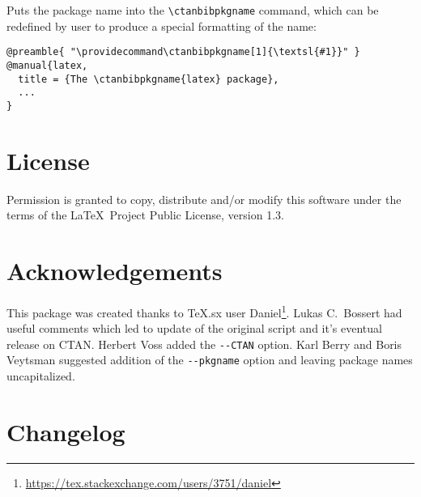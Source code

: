 \documentclass[11pt]{ltxdoc}
\begin{document}
\noindent Puts the package name into the \verb|\ctanbibpkgname| command, which can be
redefined by user to produce a special formatting of the name:

\begin{verbatim}
@preamble{ "\providecommand\ctanbibpkgname[1]{\textsl{#1}}" }
@manual{latex,
  title = {The \ctanbibpkgname{latex} package},
  ...
}
\end{verbatim}


\section{License}

Permission is granted to copy, distribute and/or modify this software
under the terms of the \LaTeX\ Project Public License, version 1.3.

\section{Acknowledgements}

This package was created thanks to TeX.sx user
Daniel\footnote{\url{https://tex.stackexchange.com/users/3751/daniel}}. Lukas
C.~Bossert had useful comments which led to update of the original script and
it's eventual release on CTAN. Herbert Voss added the \verb|--CTAN| option.
Karl Berry and Boris Veytsman suggested addition of the \verb|--pkgname| option 
and leaving package names uncapitalized.

\newpage
\section{Changelog}
\end{document}
